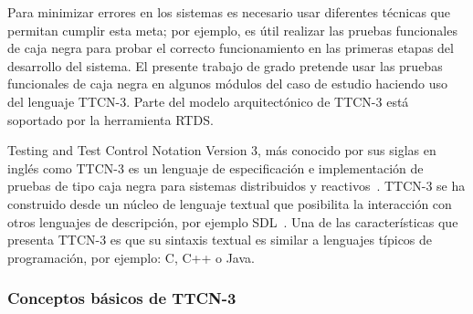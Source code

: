 Para minimizar errores en los sistemas es necesario usar diferentes t\'ecnicas 
que permitan cumplir esta meta; por ejemplo, es \'util realizar las pruebas 
funcionales de caja negra para probar el correcto funcionamiento en las primeras 
etapas del desarrollo del sistema. El presente trabajo de grado pretende usar 
las pruebas funcionales de caja negra en algunos m\'odulos del caso de estudio 
haciendo uso del lenguaje TTCN-3. Parte del modelo arquitect\'onico de TTCN-3 
est\'a soportado por la herramienta RTDS. 

Testing and Test Control Notation Version 3, m\'as conocido por sus siglas en 
ingl\'es como TTCN-3 es un lenguaje de especificaci\'on e implementaci\'on de 
pruebas de tipo caja negra para sistemas distribuidos y 
reactivos~\cite{Grabowski2003}. TTCN-3 se ha construido desde un n\'ucleo de 
lenguaje 
textual que posibilita la interacci\'on con otros lenguajes de descripci\'on, 
por ejemplo SDL~\cite{Grabowski2003,Willcock2011}. Una de las 
caracter\'isticas que presenta TTCN-3 es que su sintaxis textual es similar a 
lenguajes t\'ipicos de programaci\'on, por ejemplo: C, C++ o Java.

\subsubsection{Conceptos b\'asicos de TTCN-3}

